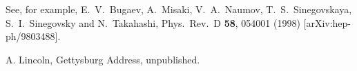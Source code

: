 \clearpage
{} %

\begin{thebibliography}{99}

  See, for example,
  E.~V.~Bugaev, A.~Misaki, V.~A.~Naumov, T.~S.~Sinegovskaya, S.~I.~Sinegovsky and N.~Takahashi,
  Phys.\ Rev.\  D {\bf 58}, 054001 (1998)
  [arXiv:hep-ph/9803488].

A. Lincoln, Gettysburg Address, unpublished.

\end{thebibliography}
